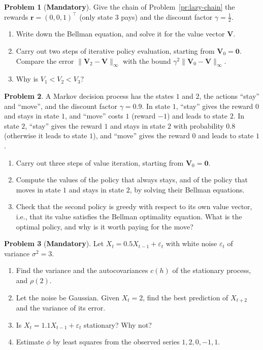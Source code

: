 \documentclass[11pt]{article}
\theoremstyle{definition}
\newtheorem{problem}{Problem}[section]
\newcommand{\mandatory}{\textcolor{red!70!black}{\textbf{Mandatory}}}
\newcommand{\norm}[1]{\lVert #1 \rVert}
\begin{document}
\begin{problem}[\mandatory]\label{pr:bellman-practice}
    Give the chain of Problem~\ref{pr:lazy-chain} the rewards $\mathbf{r} = (0, 0, 1)^\top$ (only state $3$ pays) and the discount factor $\gamma = \frac{1}{2}$.
    \begin{enumerate}[label=(\alph*)]
        \item Write down the Bellman equation, and solve it for the value vector $\mathbf{V}$.
        \item Carry out two steps of iterative policy evaluation, starting from $\mathbf{V}_0 = \mathbf{0}$. Compare the error $\norm{\mathbf{V}_2 - \mathbf{V}}_\infty$ with the bound $\gamma^2\norm{\mathbf{V}_0 - \mathbf{V}}_\infty$.
        \item Why is $V_1 < V_2 < V_3$?
    \end{enumerate}
\end{problem}

\begin{problem}\label{pr:mdp-practice}
    A Markov decision process has the states $1$ and $2$, the actions ``stay'' and ``move'', and the discount factor $\gamma = 0.9$. In state $1$, ``stay'' gives the reward $0$ and stays in state $1$, and ``move'' costs $1$ (reward $-1$) and leads to state $2$. In state $2$, ``stay'' gives the reward $1$ and stays in state $2$ with probability $0.8$ (otherwise it leads to state $1$), and ``move'' gives the reward $0$ and leads to state $1$.
    \begin{enumerate}[label=(\alph*)]
        \item Carry out three steps of value iteration, starting from $\mathbf{V}_0 = \mathbf{0}$.
        \item Compute the values of the policy that always stays, and of the policy that moves in state $1$ and stays in state $2$, by solving their Bellman equations.
        \item Check that the second policy is greedy with respect to its own value vector, i.e., that its value satisfies the Bellman optimality equation. What is the optimal policy, and why is it worth paying for the move?
    \end{enumerate}
\end{problem}

\begin{problem}[\mandatory]\label{pr:ar1-practice}
    Let $X_t = 0.5X_{t-1} + \varepsilon_t$ with white noise $\varepsilon_t$ of variance $\sigma^2 = 3$.
    \begin{enumerate}[label=(\alph*)]
        \item Find the variance and the autocovariances $c(h)$ of the stationary process, and $\rho(2)$.
        \item Let the noise be Gaussian. Given $X_t = 2$, find the best prediction of $X_{t+2}$ and the variance of its error.
        \item Is $X_t = 1.1X_{t-1} + \varepsilon_t$ stationary? Why not?
        \item Estimate $\phi$ by least squares from the observed series $1, 2, 0, -1, 1$.
    \end{enumerate}
\end{problem}
\end{document}
